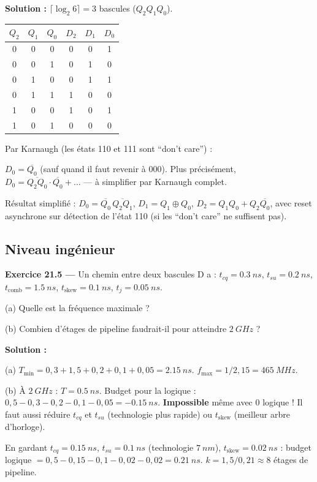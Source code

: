 \documentclass[12pt,a4paper,twoside]{book}
\begin{document}
\begin{pratique}
\textbf{Solution :} $\lceil\log_2 6\rceil = 3$ bascules ($Q_2 Q_1 Q_0$).

\begin{center}
\renewcommand{\arraystretch}{1.1}
\begin{tabular}{ccc|ccc}
\toprule
$Q_2$ & $Q_1$ & $Q_0$ & $D_2$ & $D_1$ & $D_0$ \\
\midrule
0 & 0 & 0 & 0 & 0 & 1 \\
0 & 0 & 1 & 0 & 1 & 0 \\
0 & 1 & 0 & 0 & 1 & 1 \\
0 & 1 & 1 & 1 & 0 & 0 \\
1 & 0 & 0 & 1 & 0 & 1 \\
1 & 0 & 1 & 0 & 0 & 0 \\
\bottomrule
\end{tabular}
\end{center}

Par Karnaugh (les états 110 et 111 sont ``don't care'') :

$D_0 = \overline{Q_0}$ (sauf quand il faut revenir à 000). Plus précisément, $D_0 = \overline{Q_2 Q_0} \cdot \overline{Q_0} + \ldots$ --- à simplifier par Karnaugh complet.

Résultat simplifié : $D_0 = \overline{Q_0}\,\overline{Q_2 Q_1}$, $D_1 = Q_1 \oplus Q_0$, $D_2 = Q_1 Q_0 + Q_2\overline{Q_0}$, avec reset asynchrone sur détection de l'état 110 (si les ``don't care'' ne suffisent pas).
\end{pratique}

\subsection*{Niveau ingénieur}

\textbf{Exercice 21.5 ---} Un chemin entre deux bascules D a : $t_{cq} = \SI{0.3}{ns}$, $t_{su} = \SI{0.2}{ns}$, $t_{\text{comb}} = \SI{1.5}{ns}$, $t_{\text{skew}} = \SI{0.1}{ns}$, $t_j = \SI{0.05}{ns}$.

(a) Quelle est la fréquence maximale ?

(b) Combien d'étages de pipeline faudrait-il pour atteindre $\SI{2}{GHz}$ ?

\begin{pratique}
\textbf{Solution :}

(a) $T_{\min} = 0{,}3 + 1{,}5 + 0{,}2 + 0{,}1 + 0{,}05 = \SI{2.15}{ns}$. $f_{\max} = 1/2{,}15 = \SI{465}{MHz}$.

(b) À $\SI{2}{GHz}$ : $T = \SI{0.5}{ns}$. Budget pour la logique : $0{,}5 - 0{,}3 - 0{,}2 - 0{,}1 - 0{,}05 = -\SI{0.15}{ns}$. \textbf{Impossible} même avec 0 logique ! Il faut aussi réduire $t_{cq}$ et $t_{su}$ (technologie plus rapide) ou $t_{\text{skew}}$ (meilleur arbre d'horloge).

En gardant $t_{cq} = \SI{0.15}{ns}$, $t_{su} = \SI{0.1}{ns}$ (technologie $\SI{7}{nm}$), $t_{\text{skew}} = \SI{0.02}{ns}$ : budget logique $= 0{,}5 - 0{,}15 - 0{,}1 - 0{,}02 - 0{,}02 = \SI{0.21}{ns}$. $k = 1{,}5/0{,}21 \approx 8$ étages de pipeline.
\end{pratique}
\end{document}
